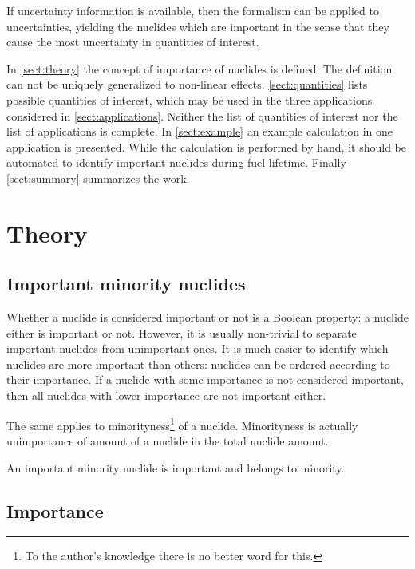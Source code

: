 
If uncertainty information is available, then the formalism can be applied to uncertainties, yielding the nuclides which are important in the sense that they cause the most uncertainty in quantities of interest.

In \autoref{sect:theory} the concept of importance of nuclides is defined. The definition can not be uniquely generalized to non-linear effects. \autoref{sect:quantities} lists possible quantities of interest, which may be used in the three applications considered in \autoref{sect:applications}. Neither the list of quantities of interest nor the list of applications is complete. In \autoref{sect:example} an example calculation in one application is presented. While the calculation is performed by hand, it should be automated to identify important nuclides during fuel lifetime. Finally \autoref{sect:summary} summarizes the work.





\section{Theory}
\label{sect:theory}

\subsection{Important minority nuclides}

Whether a nuclide is considered important or not is a Boolean property: a nuclide either is important or not. However, it is usually non-trivial to separate important nuclides from unimportant ones. It is much easier to identify which nuclides are more important than others: nuclides can be ordered according to their importance. If a nuclide with some importance is not considered important, then all nuclides with lower importance are not important either.

The same applies to minorityness\footnote{To the author's knowledge there is no better word for this.} of a nuclide. Minorityness is actually unimportance of amount of a nuclide in the total nuclide amount.

An important minority nuclide is important and belongs to minority.

\subsection{Importance}

